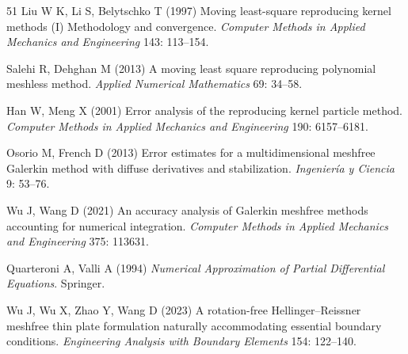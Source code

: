 \begin{thebibliography}{51}
 Liu W K, Li S, Belytschko T (1997) Moving least-square reproducing kernel methods ({I}) {Methodology} and convergence. \emph{Computer Methods in Applied Mechanics and Engineering} 143: 113--154.

 Salehi R, Dehghan M (2013) A moving least square reproducing polynomial meshless method. \emph{Applied Numerical Mathematics} 69: 34--58.

 Han W, Meng X (2001) Error analysis of the reproducing kernel particle method. \emph{Computer Methods in Applied Mechanics and Engineering} 190: 6157--6181.

 Osorio M, French D (2013) Error estimates for a multidimensional meshfree {Galerkin} method with diffuse derivatives and stabilization. \emph{Ingenier{\'i}a y Ciencia} 9: 53--76.

 Wu J, Wang D (2021) An accuracy analysis of {Galerkin} meshfree methods accounting for numerical integration. \emph{Computer Methods in Applied Mechanics and Engineering} 375: 113631.

 Quarteroni A, Valli A (1994) \emph{Numerical Approximation of Partial Differential Equations}. Springer.

 Wu J, Wu X, Zhao Y, Wang D (2023) A rotation-free {Hellinger--Reissner} meshfree thin plate formulation naturally accommodating essential boundary conditions. \emph{Engineering Analysis with Boundary Elements} 154: 122--140.

\end{thebibliography}
